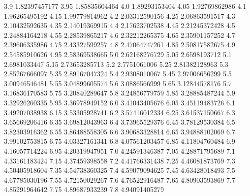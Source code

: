             3.9    1.82397457177
           3.95    1.85835604464
            4.0    1.89293153404
           4.05    1.92769862986
            4.1    1.96265495192
           4.15    1.99779814962
            4.2    2.03312590156
           4.25    2.06863591517
            4.3    2.10432592635
           4.35    2.14019369915
            4.4    2.17623702538
           4.45    2.21245372428
            4.5    2.24884164218
           4.55    2.28539865217
            4.6    2.32212265375
           4.65    2.35901157252
            4.7    2.39606335986
           4.75    2.43327599257
            4.8    2.47064747261
           4.85    2.50817582675
            4.9    2.54585910626
           4.95    2.58369538665
            5.0    2.62168276729
           5.05     2.6598193712
            5.1     2.6981033447
           5.15    2.73653285713
            5.2     2.7751061006
           5.25    2.81382128963
            5.3    2.85267666097
           5.35    2.89167047324
            5.4     2.9308010067
           5.45    2.97006656299
            5.5    3.00946546481
           5.55    3.04899605574
            5.6     3.0886566999
           5.65    3.12844578176
            5.7    3.16836170583
           5.75    3.20840289647
            5.8    3.24856779759
           5.85    3.28885487244
            5.9    3.32926260335
           5.95    3.36978949152
            6.0    3.41043405676
           6.05    3.45119483726
            6.1    3.49207038938
           6.15    3.53305928741
            6.2    3.57416012334
           6.25    3.61537150667
            6.3    3.65669206416
           6.35    3.69812043963
            6.4    3.73965529376
           6.45    3.78129530384
            6.5    3.82303916362
           6.55    3.86488558305
            6.6    3.90683328814
           6.65    3.94888102069
            6.7    3.99102753815
           6.75    4.03327161341
            6.8    4.07561203457
           6.85    4.11804760484
            6.9    4.16057714224
           6.95    4.20319947951
            7.0    4.24591346387
           7.05    4.28871795689
            7.1    4.33161183424
           7.15    4.37459398558
            7.2    4.41766331438
           7.25    4.46081873769
            7.3    4.50405918604
           7.35    4.54738360325
            7.4    4.59079094625
           7.45    4.63428018493
            7.5    4.67785030196
           7.55    4.72150029267
            7.6    4.76522916487
           7.65    4.80903593869
            7.7    4.85291964642
           7.75    4.89687933239
            7.8    4.94091405279
